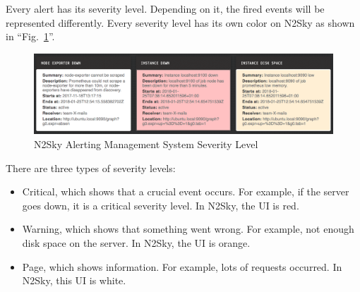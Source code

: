 Every alert has its severity level. Depending on it, the fired events will be represented differently. Every severity level has its own color on N2Sky as shown in ``Fig.~\ref{fig:alert_severity}''.

\begin{figure}[htbp]
\begin{center}
  \includegraphics[width=\linewidth]{components/3/alerts/alert_severity.png}
  \caption{N2Sky Alerting Management System Severity Level}
  \label{fig:alert_severity}
\end{center}
\end{figure}

There are three types of severity levels:
\begin{itemize}
\item Critical, which shows that a crucial event occurs. For example, if the server goes down, it is a critical severity level.  In N2Sky, the UI is red. 
\item Warning, which shows that something went wrong. For example, not enough disk space on the server. In N2Sky, the UI is orange. 
\item Page, which shows information. For example, lots of requests occurred. In N2Sky, this UI is white.  
\end{itemize}
 




